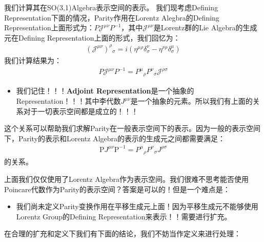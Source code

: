     我们计算其在SO(3,1)Algebra表示空间的表示。
    我们现考虑Defining Representation下面的情况，Parity作用在Lorentz
    Alegbra的Defining Representation上面形式为：$ P \mathcal{J}^{\mu\nu}
    P^{-1} $，其中$ \mathcal{J}^{\mu\nu} $是Lorentz群的Lie
    Algebra的生成元在Defining Representation上面的形式，我们回忆为：
    \begin{align}
      (\mathcal{J}^{\mu\nu})^\rho{}_\sigma = i(\eta^{\mu \rho}
      \delta^\nu_\sigma - \eta^{\nu \rho} \delta^\mu_\sigma)
    \end{align}
    我们计算结果为：
    \begin{align}
      P \mathcal{J}^{\mu \nu} P^{-1} = P^\mu{}_\rho
      P^\nu{}_\sigma\mathcal{J}^{\rho\sigma}
    \end{align}
    \begin{itemize}
      \item 我们记住！！！\textbf{Adjoint
        Representation}是一个抽象的Representation！！！其中李代数$ J^{\mu\nu}
        $是一个抽象的元素。所以我们有上面的关系对于一切表示空间都是成立的！！！
    \end{itemize}
    这个关系可以帮助我们求解Parity在一般表示空间下的表示。因为一般的表示空间下，Parity的表示和Lorentz
    Algebra的表示的生成元之间都需要满足：
    \begin{align}
      \mathrm{P} J^{\mu\nu} \mathrm{P}^{-1} = P^\mu{}_\rho
      P^\nu{}_\sigma J^{\rho\sigma}
    \end{align}
    的关系。

    \bigskip

    上面我们仅仅使用了Lorentz
    Algebra作为表示空间。我们很难不思考能否使用Poincare代数作为Parity的表示空间？答案是可以的！但是一个难点是：
    \begin{itemize}
      \item 我们尚未定义Parity变换作用在平移生成元上面！因为平移生成元不能够使用Lorentz
        Group的Defining Representation来表示！！需要进行扩充。
    \end{itemize}
    在合理的扩充和定义下我们有下面的结论，我们不妨当作定义来进行处理：
    \YL{[这个是抄Weinberg之中的讨论的！]}

